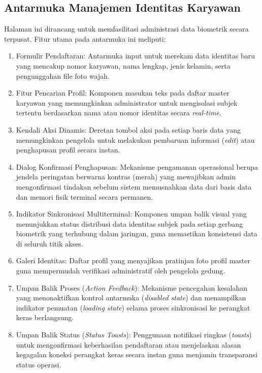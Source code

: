 \subsection{Antarmuka Manajemen Identitas Karyawan}
Halaman ini dirancang untuk memfasilitasi administrasi data biometrik secara terpusat. Fitur utama pada antarmuka ini meliputi:
\begin{enumerate}
    \item Formulir Pendaftaran: Antarmuka input untuk merekam data identitas baru yang mencakup nomor karyawan, nama lengkap, jenis kelamin, serta pengunggahan file foto wajah.
    \item Fitur Pencarian Profil: Komponen masukan teks pada daftar master karyawan yang memungkinkan administrator untuk mengisolasi subjek tertentu berdasarkan nama atau nomor identitas secara \textit{real-time}.
    \item Kendali Aksi Dinamis: Deretan tombol aksi pada setiap baris data yang memungkinkan pengelola untuk melakukan pembaruan informasi (\textit{edit}) atau penghapusan profil secara instan.
    \item Dialog Konfirmasi Penghapusan: Mekanisme pengamanan operasional berupa jendela peringatan berwarna kontras (merah) yang mewajibkan admin mengonfirmasi tindakan sebelum sistem memusnahkan data dari basis data dan memori fisik terminal secara permanen.
    \item Indikator Sinkronisasi Multiterminal: Komponen umpan balik visual yang menunjukkan status distribusi data identitas subjek pada setiap gerbang biometrik yang terhubung dalam jaringan, guna memastikan konsistensi data di seluruh titik akses.
    \item Galeri Identitas: Daftar profil yang menyajikan pratinjau foto profil master guna mempermudah verifikasi administratif oleh pengelola gedung.
    \item Umpan Balik Proses (\textit{Action Feedback}): Mekanisme pencegahan kesalahan yang menonaktifkan kontrol antarmuka (\textit{disabled state}) dan menampilkan indikator pemuatan (\textit{loading state}) selama proses sinkronisasi ke perangkat keras berlangsung.
    \item Umpan Balik Status (\textit{Status Toasts}): Penggunaan notifikasi ringkas (\textit{toasts}) untuk mengonfirmasi keberhasilan pendaftaran atau menjelaskan alasan kegagalan koneksi perangkat keras secara instan guna menjamin transparansi status operasi.
\end{enumerate}

